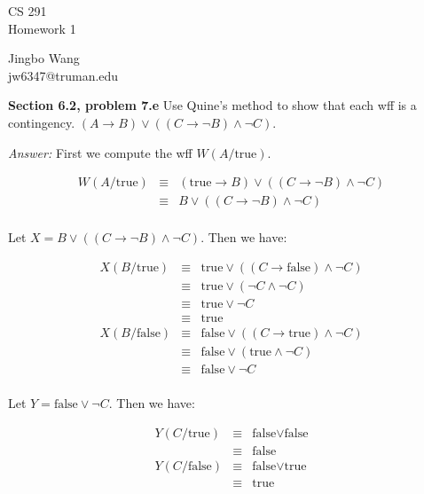 \documentclass[12pt]{article}
\begin{document}
\begin{center}
{\large CS 291}\\
Homework 1
\end{center}

\begin{flushright}
Jingbo Wang\\
jw6347@truman.edu
\end{flushright}

\textbf{Section 6.2, problem 7.e}  Use Quine's method to show that each wff is a contingency.
$(A \rightarrow B) \lor ((C \rightarrow \neg B) \land \neg C)$.

\emph{Answer:} First we compute the wff $W(A/\text{true})$.

\begin{center}
\begin{eqnarray*}
W(A/\text{true}) & \equiv & (\text{true} \rightarrow B) \lor ((C
\rightarrow \neg B) \land \neg C) \\ 
& \equiv & B \lor ((C \rightarrow \neg B) \land \neg C) \\ 
\end{eqnarray*}
\end{center}

Let $ X = B \lor ((C \rightarrow \neg B) \land \neg C).$ Then we have:

\begin{center}
\begin{eqnarray*}
X(B/\text{true}) & \equiv & \text{true} \lor ((C \rightarrow 
\text{false}) \land \neg C) \\
& \equiv & \text{true} \lor (\neg C \land \neg C) \\
& \equiv & \text{true} \lor \neg C \\ 
& \equiv & \text{true} \\
X(B/\text{false}) & \equiv & \text{false} \lor ((C \rightarrow 
\text{true}) \land \neg C) \\
& \equiv & \text{false} \lor (\text{true} \land \neg C) \\
& \equiv & \text{false} \lor \neg C \\
\end{eqnarray*}
\end{center}

Let $ Y = \text{false} \lor \neg C.$ Then we have:

\begin{center}
\begin{eqnarray*}
Y(C/\text{true}) & \equiv & \text{false} \lor \text{false} \\
& \equiv & \text{false} \\
Y(C/\text{false}) & \equiv & \text{false} \lor \text{true} \\
& \equiv & \text{true} \\
\end{eqnarray*}
\end{center}
\end{document}
